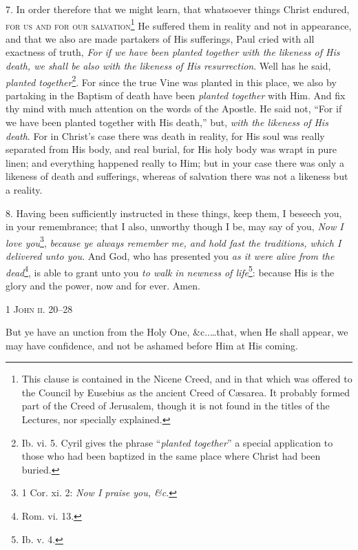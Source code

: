 7. In order therefore that we might learn, that whatsoever things Christ endured, \textsc{for us and for our salvation\footnote{This clause is contained in the Nicene Creed, and in that which was offered to the Council by Eusebius as the ancient Creed of Cæsarea. It probably formed part of the Creed of Jerusalem, though it is not found in the titles of the Lectures, nor specially explained.}} He suffered them in reality and not in appearance, and that we also are made partakers of His sufferings, Paul cried with all exactness of truth, \emph{For if we have been planted together with the likeness of His death, we shall be also with the likeness of His resurrection}. Well has he said, \emph{planted together}\footnote{Ib. vi. 5. Cyril gives the phrase “\emph{planted together}” a special application to those who had been baptized in the same place where Christ had been buried.}. For since the true Vine was planted in this place, we also by partaking in the Baptism of death have been \emph{planted together} with Him. And fix thy mind with much attention on the words of the Apostle. He said not, “For if we have been planted together with His death,” but, \emph{with the likeness of His death}. For in Christ’s case there was death in reality, for His soul was really separated from His body, and real burial, for His holy body was wrapt in pure linen; and everything happened really to Him; but in your case there was only a likeness of death and sufferings, whereas of salvation there was not a likeness but a reality.

8. Having been sufficiently instructed in these things, keep them, I beseech you, in your remembrance; that I also, unworthy though I be, may say of you, \emph{Now I love you}\footnote{1 Cor. xi. 2: \emph{Now I praise you, \&c}.}, \emph{because ye always remember me, and hold fast the traditions, which I delivered unto you}. And God, who has presented you \emph{as it were alive from the dead}\footnote{Rom. vi. 13.}, is able to grant unto you \emph{to walk in newness of life}\footnote{Ib. v. 4.}: because His is the glory and the power, now and for ever. Amen.


\textsc{1 John ii. 20–28}

But ye have an unction from the Holy One, \&c..…that, when He shall appear, we may have confidence, and not be ashamed before Him at His coming.

